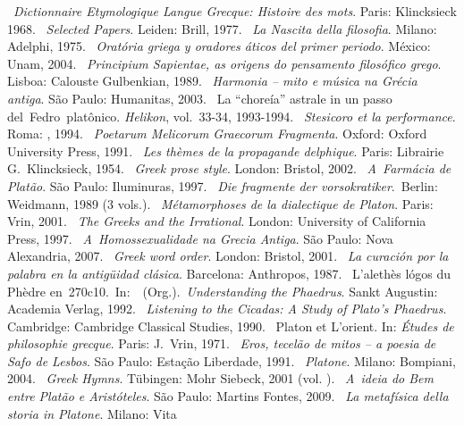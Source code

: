 \begin{bibliohedra}
~\emph{Dictionnaire Etymologique Langue Grecque: Histoire
  des mots}. Paris: Klincksieck 1968.
~\emph{Selected Papers}. Leiden: Brill, 1977.
~\emph{La Nascita della filosofia}. Milano: Adelphi, 1975.
~\emph{Oratória griega y oradores áticos del primer periodo}. México: Unam, 2004.
~\emph{Principium Sapientae, as origens do pensamento
  filosófico grego}. Lisboa: Calouste Gulbenkian, 1989.
~\emph{Harmonia -- mito e música na Grécia antiga}. São
  Paulo: Humanitas, 2003.
~La ``choreía'' astrale in un passo
  del~Fedro~platônico. \emph{Helikon}, vol.~33-34, 1993-1994.
~\emph{Stesicoro et la performance}. Roma: , 1994.
~\emph{Poetarum Melicorum Graecorum Fragmenta}. Oxford: Oxford University Press,
  1991.
~\emph{Les thèmes de la propagande delphique}. Paris:
  Librairie G.~Klincksieck, 1954.
~\emph{Greek prose style}. London: Bristol, 2002.
~\emph{A~Farmácia de Platão}. São Paulo: Iluminuras, 1997.
~\emph{Die fragmente der
  vorsokratiker}.~Berlin: Weidmann, 1989 (3 vols.).
~\emph{Métamorphoses de la dialectique de Platon}. Paris:
  Vrin, 2001.
~\emph{The Greeks and the Irrational}. London: University
  of California Press, 1997.
~\emph{A~Homossexualidade na Grecia Antiga}. São Paulo:
  Nova Alexandria, 2007.
~\emph{Greek word order}. London: Bristol, 2001.
~\emph{La curación por la palabra en la antigüidad
  clásica}. Barcelona: Anthropos, 1987.
~L'alethès lógos du Phèdre
  en~270c10.~In:~~(Org.).~\emph{Understanding the
  Phaedrus}. Sankt Augustin: Academia Verlag, 1992.
~\emph{Listening to the Cicadas: A Study of Plato's
  Phaedrus}. Cambridge: Cambridge Classical Studies, 1990.
~Platon et L'orient. In: \emph{Études de philosophie
  grecque}. Paris: J.~Vrin, 1971.
~\emph{Eros, tecelão de mitos -- a poesia de Safo de
  Lesbos}. São Paulo: Estação Liberdade, 1991.
~\emph{Platone}. Milano: Bompiani, 2004.
~\emph{Greek Hymns}. Tübingen: Mohr
  Siebeck, 2001 (vol. ).
~\emph{A~ideia do Bem entre Platão e Aristóteles}. São
  Paulo: Martins Fontes, 2009.
~\emph{La metafísica della storia in Platone}. Milano: Vita

\end{bibliohedra}
